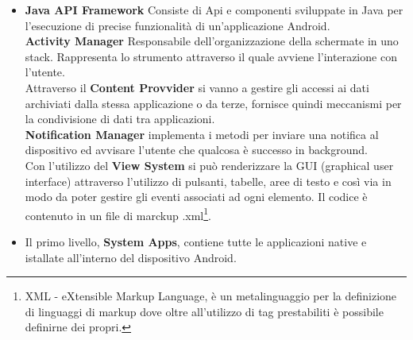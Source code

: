 \begin{itemize}
\item \textbf{Java API Framework} Consiste di Api e componenti sviluppate in Java per l'esecuzione di precise funzionalità di un'applicazione Android. 
\\\textbf{Activity Manager} Responsabile dell'organizzazione della schermate in uno stack. Rappresenta lo strumento attraverso il quale avviene l'interazione con l'utente. 
\\Attraverso il \textbf{{Content Provvider}} si vanno a gestire gli accessi ai dati archiviati dalla stessa applicazione o da terze, fornisce quindi meccanismi per la condivisione di dati tra applicazioni. 
\\\textbf{Notification Manager} implementa i metodi per inviare una notifica al dispositivo ed avvisare l'utente che qualcosa è successo in background. 
\\Con l'utilizzo del \textbf{View System} si può renderizzare la GUI (graphical user interface) attraverso l'utilizzo di pulsanti, tabelle, aree di testo e così via in modo da poter gestire gli eventi associati ad ogni elemento. Il codice è contenuto in un file di marckup .xml\footnote{XML - eXtensible Markup Language, è un metalinguaggio per la definizione di linguaggi di markup dove oltre all'utilizzo di tag prestabiliti è possibile definirne dei propri.}.
\item Il primo livello, \textbf{System Apps}, contiene tutte le applicazioni native e istallate all'interno del dispositivo Android. 
\end{itemize}



